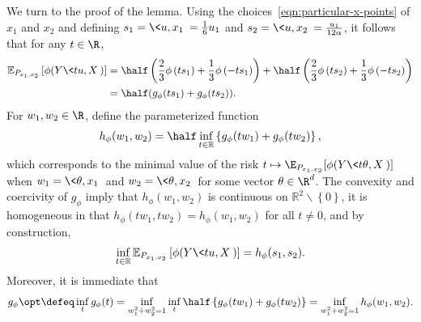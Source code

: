 \documentclass[11pt]{article}
\newcommand{\Ep}{\mathbb{E}}
\newcommand{\real}{\mathbb{R}} %
\newcommand{\prn}[1]{\left({#1}\right)} %
\newcommand{\brk}[1]{\left[{#1}\right]} %
\newcommand{\dstr}{P}
\begin{document}
We turn to the proof of the lemma.
%
Using the choices~\eqref{eqn:particular-x-points}
of $x_1$ and $x_2$ and defining $s_1 = \<u, x_1\> = \frac{1}{6} u_1$
and $s_2 = \<u, x_2\> = \frac{u_1}{12 \alpha}$,
it follows that for any $t \in \R$,
\begin{align*}
  \Ep_{\dstr_{x_1, x_2}}  \brk{\phi(Y \<tu , X\>)}
  & = \half\prn{\frac{2}{3} \phi\prn{t s_1} + \frac{1}{3} \phi\prn{-t s_1}}
  + \half \prn{ \frac{2}{3} \phi \prn{t s_2 } + \frac{1}{3} \phi\prn{-t s_2}}
  \\
  & = \half (g_\phi(ts_1) + g_\phi(ts_2)).
\end{align*}
For $w_1, w_2 \in \R$,
define the parameterized function
\begin{align*}
  h_\phi(w_1, w_2) = \half \inf_{t \in \real} \left\{g_\phi(tw_1)
  + g_\phi(tw_2)\right\},
\end{align*}
which corresponds to the minimal value of the risk $t \mapsto
\E_{P_{x_1,x_2}}[\phi(Y \<t \theta, X\>)]$ when $w_1 = \<\theta, x_1\>$ and
$w_2 = \<\theta, x_2\>$ for some vector $\theta \in \R^d$.
%
The convexity and coercivity of $g_\phi$ imply that $h_\phi(w_1, w_2)$ is
continuous on $\real^2 \backslash \left\{0\right\}$, it is homogeneous in
that $h_\phi(tw_1, tw_2) = h_\phi(w_1, w_2)$ for all $t \neq 0$, and
by construction,
\begin{align*}
  \inf_{t \in \real} \Ep_{\dstr_{x_1, x_2}}  \brk{\phi(Y \<tu , X\>)}
  = h_\phi(s_1, s_2).
\end{align*}
Moreover, it is immediate that
\begin{equation*}
  g_\phi\opt \defeq \inf_t g_\phi(t) = \inf_{w_1^2 + w_2^2 = 1}
  \inf_t \half \left\{g_\phi(t w_1) + g_\phi(t w_2)\right\}
  = \inf_{w_1^2 + w_2^2 = 1} h_\phi(w_1, w_2).
\end{equation*}
\end{document}
